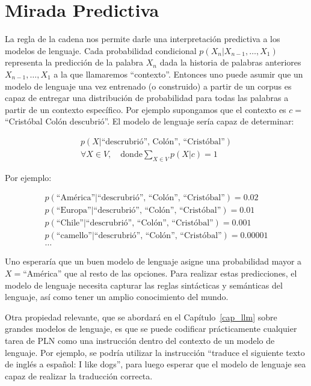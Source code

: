 \section{Mirada Predictiva}
La regla de la cadena nos permite darle una interpretación predictiva a los modelos de lenguaje. Cada probabilidad condicional $p(X_n|X_{n-1},\ldots,X_1)$ representa la predicción de la palabra $X_n$ dada la historia de palabras anteriores $X_{n-1},\ldots,X_1$ a la que llamaremos ``contexto''.  Entonces uno puede asumir que un modelo de lenguaje una vez entrenado (o construido) a partir de un corpus es capaz de entregar una distribución de probabilidad para todas las palabras a partir de un contexto específico.
Por ejemplo supongamos que el contexto es $c=$``Cristóbal Colón descubrió''. El modelo de lenguaje sería capaz de determinar:

\begin{align*}
p(X|\text{``descrubrió'', Colón'', ``Cristóbal''}) \\
\forall X \in V, \quad \text{donde} \sum_{X\in V}p(X|c)=1 
\end{align*}

Por ejemplo:

 
\begin{align*}
p(\text{``América''}|\text{``descrubrió'', ``Colón'', ``Cristóbal''}) = 0.02 \\
p(\text{``Europa''}|\text{``descrubrió'', ``Colón'', ``Cristóbal''}) = 0.01 \\
p(\text{``Chile''}|\text{``descrubrió'', ``Colón'', ``Cristóbal''}) = 0.001\\
p(\text{``camello''}|\text{``descrubrió'', ``Colón'', ``Cristóbal''}) = 0.00001 \\
\ldots
\end{align*}

Uno esperaría que un buen modelo de lenguaje asigne una probabilidad mayor a $X=$``América'' que al resto de las opciones. Para realizar estas predicciones, el modelo de lenguaje necesita capturar las reglas sintácticas y semánticas del lenguaje, así como tener un amplio conocimiento del mundo. 

Otra propiedad relevante, que se abordará en el Capítulo~\ref{cap_llm} sobre grandes modelos de lenguaje, es que se puede codificar prácticamente cualquier tarea de PLN como una instrucción dentro del contexto de un modelo de lenguaje. Por ejemplo, se podría utilizar la instrucción ``traduce el siguiente texto de inglés a español: I like dogs'', para luego esperar que el modelo de lenguaje sea capaz de realizar la traducción correcta.

